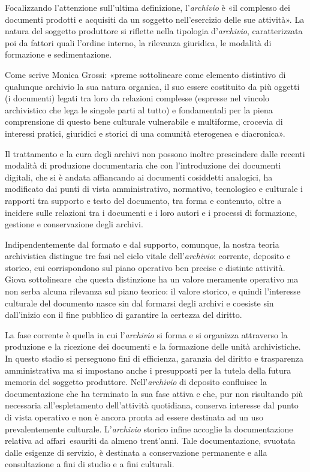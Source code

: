 \documentclass[
  b5paper,
  twoside,
  11pt,
  chapterprefix=false,
  bibliography=totocnumbered,
  parskip=0]{scrbook}
\begin{document}
Focalizzando l'attenzione sull'ultima definizione, l'\emph{archivio} è «il
complesso dei documenti prodotti e acquisiti da un soggetto
nell'esercizio delle sue attività». La natura del soggetto produttore si
riflette nella tipologia d'\emph{archivio}, caratterizzata poi da fattori
quali l'ordine interno, la rilevanza giuridica, le modalità di
formazione e sedimentazione.

Come scrive Monica Grossi: «preme sottolineare come elemento distintivo
di qualunque archivio la sua natura organica, il suo essere costituito
da più oggetti (i documenti) legati tra loro da relazioni complesse
(espresse nel vincolo archivistico che lega le singole parti al tutto) e
fondamentali per la piena comprensione di questo bene culturale
vulnerabile e multiforme, crocevia di interessi pratici, giuridici e
storici di una comunità eterogenea e diacronica».

Il trattamento e la cura degli archivi non possono inoltre prescindere
dalle recenti modalità di produzione documentaria che con l'introduzione
dei documenti digitali, che si è andata affiancando ai documenti
cosiddetti analogici, ha modificato dai punti di vista amministrativo,
normativo, tecnologico e culturale i rapporti tra supporto e testo del
documento, tra forma e contenuto, oltre a incidere sulle relazioni tra i
documenti e i loro autori e i processi di formazione, gestione e
conservazione degli archivi.

Indipendentemente dal formato e dal supporto, comunque, la nostra teoria
archivistica distingue tre fasi nel ciclo vitale dell'\emph{archivio}:
corrente, deposito e storico, cui corrispondono sul piano operativo ben
precise e distinte attività. Giova sottolineare~che questa distinzione
ha un valore meramente operativo ma non serba alcuna rilevanza sul piano
teorico: il valore storico, e quindi l'interesse culturale del documento
nasce sin dal formarsi degli archivi e coesiste sin dall'inizio con il
fine pubblico di garantire la certezza del diritto.

La fase corrente è quella in cui l'\emph{archivio} si forma e si organizza
attraverso la produzione e la ricezione dei documenti e la formazione
delle unità archivistiche. In questo stadio si perseguono fini di
efficienza, garanzia del diritto e trasparenza amministrativa ma si
impostano anche i presupposti per la tutela della futura memoria del
soggetto produttore. Nell'\emph{archivio} di deposito confluisce la
documentazione che ha terminato la sua fase attiva e che, pur non
risultando più necessaria all'espletamento dell'attività quotidiana,
conserva interesse dal punto di vista operativo e non è ancora pronta ad
essere destinata ad un uso prevalentemente culturale. L'\emph{archivio}
storico infine accoglie la documentazione relativa ad affari~esauriti da
almeno trent'anni. Tale documentazione, svuotata dalle esigenze di
servizio, è destinata a conservazione permanente e alla consultazione a
fini di studio e a fini culturali.
\end{document}
